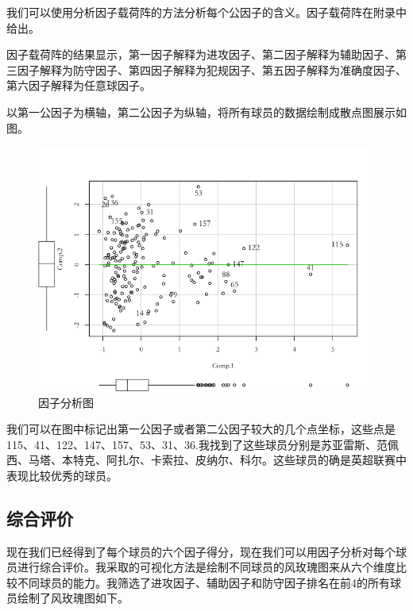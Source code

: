 \documentclass[12pt,a4paper,onecolumn]{article}
\begin{document}
我们可以使用分析因子载荷阵的方法分析每个公因子的含义。因子载荷阵在附录中给出。

因子载荷阵的结果显示，第一因子解释为进攻因子、第二因子解释为辅助因子、第三因子解释为防守因子、第四因子解释为犯规因子、第五因子解释为准确度因子、第六因子解释为任意球因子。

以第一公因子为横轴，第二公因子为纵轴，将所有球员的数据绘制成散点图展示如图。

\begin{figure}[H]
\centering
\includegraphics[width=400pt]{两个公因子.png}
\caption{\small{因子分析图}}
\end{figure}

我们可以在图中标记出第一公因子或者第二公因子较大的几个点坐标，这些点是115、41、122、147、157、53、31、36.我找到了这些球员分别是苏亚雷斯、范佩西、马塔、本特克、阿扎尔、卡索拉、皮纳尔、科尔。这些球员的确是英超联赛中表现比较优秀的球员。

\subsection{综合评价}

现在我们已经得到了每个球员的六个因子得分，现在我们可以用因子分析对每个球员进行综合评价。我采取的可视化方法是绘制不同球员的风玫瑰图来从六个维度比较不同球员的能力。我筛选了进攻因子、辅助因子和防守因子排名在前4的所有球员绘制了风玫瑰图如下。
\end{document}
